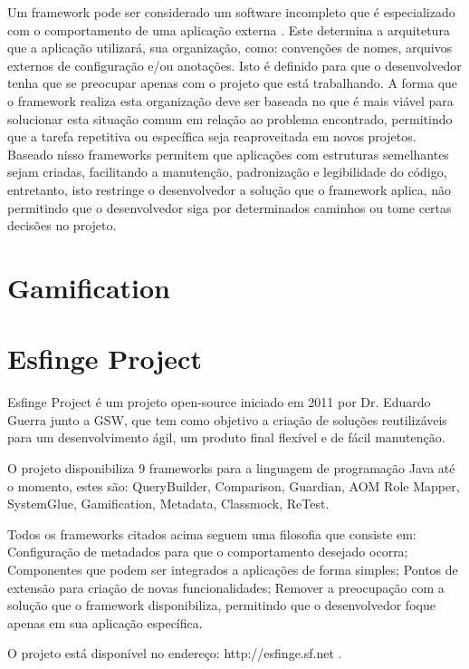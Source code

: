 \par Um framework pode ser considerado um software incompleto que é especializado com o comportamento de uma aplicação externa \cite{johnson1988designing}. Este determina a arquitetura que a aplicação utilizará, sua organização, como: convenções de nomes, arquivos externos de configuração e/ou anotações. Isto é definido para que o desenvolvedor tenha que se preocupar apenas com o projeto que está trabalhando. A forma que o framework realiza esta organização deve ser baseada no que é mais viável para solucionar esta situação comum em relação ao problema encontrado, permitindo que a tarefa repetitiva ou específica seja reaproveitada em novos projetos.
Baseado nisso frameworks permitem que aplicações com estruturas semelhantes sejam criadas, facilitando a manutenção, padronização e legibilidade do código, entretanto, isto restringe o desenvolvedor a solução que o framework aplica, não permitindo que o desenvolvedor siga por determinados caminhos ou tome certas decisões no projeto.\cite{gamma2009padroes}

\section{Gamification}


\section{Esfinge Project}

\par Esfinge Project é um projeto open-source iniciado em 2011 por Dr. Eduardo Guerra junto a GSW, que tem como objetivo a criação de soluções reutilizáveis para um desenvolvimento ágil, um produto final flexível e de fácil manutenção.
\par O projeto disponibiliza 9 frameworks para a linguagem de programação Java até o momento, estes são: QueryBuilder, Comparison,
Guardian, AOM Role Mapper, SystemGlue, Gamification, Metadata, Classmock, ReTest.
\par Todos os frameworks citados acima seguem uma filosofia que consiste em: Configuração de metadados para que o comportamento desejado ocorra; Componentes que podem ser integrados a aplicações de forma simples; Pontos de extensão para criação de novas funcionalidades; Remover a preocupação com a solução que o framework disponibiliza, permitindo que o desenvolvedor foque apenas em sua aplicação específica.
\par O projeto está disponível no endereço: http://esfinge.sf.net \cite{esfinge2011}.

